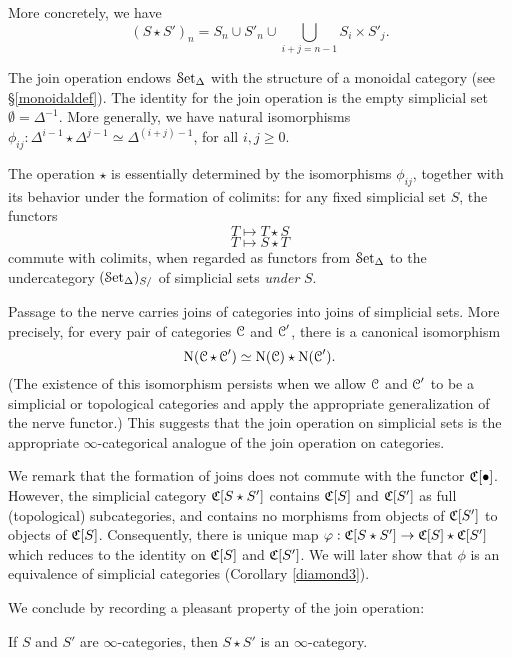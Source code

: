 \begin{1.2.8 Joins of inf-cats}
More concretely, we have $$(S \star S')_{n} =
S_n \cup S'_n \cup \bigcup_{i+j = n-1} S_i \times S'_j.$$

The join operation endows $\operatorname{\mathcal{S}et_{\Delta}}$ with the
structure of a monoidal category (see \S \ref{monoidaldef}).
The identity for the join operation is
the empty simplicial set $\emptyset = \Delta^{-1}$. More generally, we have
natural isomorphisms $\phi_{ij}: \Delta^{i-1} \star \Delta^{j-1} \simeq
\Delta^{(i+j)-1}$, for all $i, j \geq 0$.

\begin{remark}
The operation $\star$ is essentially determined by the isomorphisms
$\phi_{ij}$, together with its behavior under the formation of
colimits: for any fixed simplicial set $S$, the functors
$$ T \mapsto T \star S$$
$$ T \mapsto S \star T$$
commute with colimits, when regarded as functors from $\operatorname{\mathcal{S}et_{\Delta}}$ to
the undercategory $(\operatorname{\mathcal{S}et_{\Delta}})_{S/}$ of simplicial sets {\em under} $S$.
\end{remark}

Passage to the nerve carries joins of
categories into joins of simplicial sets. More precisely, for every pair of
categories $\operatorname{\mathcal{C}}$ and $\operatorname{\mathcal{C}}'$, there is
a canonical isomorphism $$\operatorname{N}( \operatorname{\mathcal{C}} \star \operatorname{\mathcal{C}}') \simeq
\operatorname{N}(\operatorname{\mathcal{C}}) \star \operatorname{N}(\operatorname{\mathcal{C}}').$$ (The existence of this
isomorphism persists when we allow $\operatorname{\mathcal{C}}$ and $\operatorname{\mathcal{C}}'$ to be a simplicial or
topological categories and apply the appropriate generalization of
the nerve functor.) This suggests that the join operation on
simplicial sets is the appropriate $\infty$-categorical analogue of
the join operation on categories.

We remark that the formation of joins does not commute with the
functor $\operatorname{\mathfrak{C}}[\bullet]$. However, the simplicial category $\operatorname{\mathfrak{C}}[S \star S']$
contains $\operatorname{\mathfrak{C}}[S]$ and $\operatorname{\mathfrak{C}}[S']$ as full (topological)
subcategories, and contains no morphisms from objects of
$\operatorname{\mathfrak{C}}[S']$ to objects of $\operatorname{\mathfrak{C}}[S]$. Consequently, there is unique map $\varphi: \operatorname{\mathfrak{C}}[S \star S'] \rightarrow \operatorname{\mathfrak{C}}[S] \star \operatorname{\mathfrak{C}}[S']$ which reduces to the identity on
$\operatorname{\mathfrak{C}}[S]$ and $\operatorname{\mathfrak{C}}[S']$. We will later show that $\phi$ is an equivalence of simplicial categories (Corollary \ref{diamond3}).

We conclude by recording a pleasant property of the join
operation:

\begin{proposition}
If $S$ and $S'$ are $\infty$-categories, then $S \star S'$ is an $\infty$-category.
\end{proposition}


\end{1.2.8 Joins of inf-cats}
